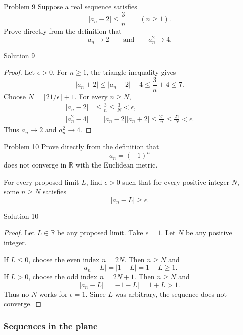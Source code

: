 \documentclass{beamer}
\begin{document}
\begin{frame}{Problem 9}
Suppose a real sequence satisfies
\[
  \lvert a_n-2\rvert\leq\frac{3}{n}
  \qquad(n\geq1).
\]
Prove directly from the definition that
\[
  a_n\longrightarrow2
  \qquad\text{and}\qquad
  a_n^2\longrightarrow4.
\]
\end{frame}

\begin{frame}{Solution 9}
\begin{proof}
Let $\epsilon>0$. For $n\geq1$, the triangle inequality gives
\[
  \lvert a_n+2\rvert\leq\lvert a_n-2\rvert+4
  \leq\frac{3}{n}+4\leq7.
\]
Choose $N=\lfloor21/\epsilon\rfloor+1$. For every $n\geq N$,
\[
\begin{aligned}
  \lvert a_n-2\rvert
    &\leq\frac{3}{n}\leq\frac{3}{N}<\epsilon,\\
  \lvert a_n^2-4\rvert
    &=\lvert a_n-2\rvert\lvert a_n+2\rvert
      \leq\frac{21}{n}\leq\frac{21}{N}<\epsilon.
\end{aligned}
\]
Thus $a_n\to2$ and $a_n^2\to4$.
\end{proof}
\end{frame}

\begin{frame}{Problem 10}
Prove directly from the definition that
\[
  a_n=(-1)^n
\]
does not converge in $\mathbb R$ with the Euclidean metric.
\medskip

For every proposed limit $L$, find $\epsilon>0$ such that for
every positive integer $N$, some $n\geq N$ satisfies
\[
  \lvert a_n-L\rvert\geq\epsilon.
\]
\end{frame}

\begin{frame}{Solution 10}
\begin{proof}
Let $L\in\mathbb R$ be any proposed limit. Take $\epsilon=1$.
Let $N$ be any positive integer.
\medskip

If $L\leq0$, choose the even index $n=2N$. Then $n\geq N$ and
\[
  \lvert a_n-L\rvert=\lvert1-L\rvert=1-L\geq1.
\]
If $L>0$, choose the odd index $n=2N+1$. Then $n\geq N$ and
\[
  \lvert a_n-L\rvert=\lvert-1-L\rvert=1+L>1.
\]
Thus no $N$ works for $\epsilon=1$. Since $L$ was arbitrary,
the sequence does not converge.
\end{proof}
\end{frame}

\subsubsection{Sequences in the plane}
\end{document}
